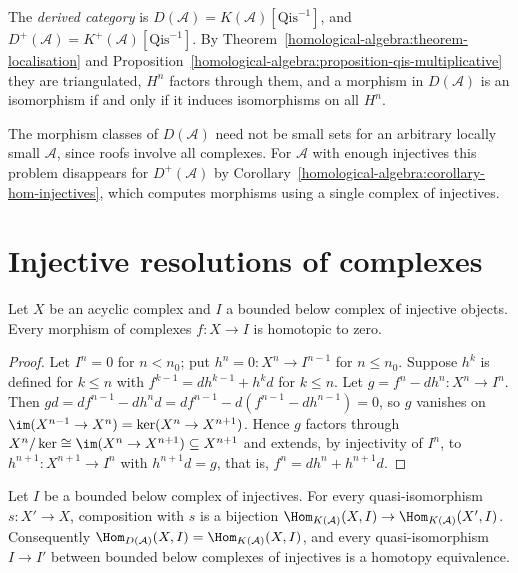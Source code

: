 \begin{definition}\label{homological-algebra:definition-derived-category}
The \emph{derived category} is $D(\mathcal{A}) = K(\mathcal{A})[\mathrm{Qis}^{-1}]$, and $D^+(\mathcal{A}) = K^+(\mathcal{A})[\mathrm{Qis}^{-1}]$. By
Theorem~\ref{homological-algebra:theorem-localisation} and Proposition~\ref{homological-algebra:proposition-qis-multiplicative} they are
triangulated, $H^n$ factors through them, and a morphism in $D(\mathcal{A})$ is an isomorphism if and only if it induces
isomorphisms on all $H^n$.
\end{definition}

\begin{remark}\label{homological-algebra:remark-size}
The morphism classes of $D(\mathcal{A})$ need not be small sets for an arbitrary locally small $\mathcal{A}$, since roofs involve all complexes.
For $\mathcal{A}$ with enough injectives this problem disappears for $D^+(\mathcal{A})$ by
Corollary~\ref{homological-algebra:corollary-hom-injectives}, which computes morphisms using a single complex of injectives.
\end{remark}

\section{Injective resolutions of complexes}\label{homological-algebra:section-injective-resolutions}

\begin{lemma}\label{homological-algebra:lemma-acyclic-to-injective}
Let $X$ be an acyclic complex and $I$ a bounded below complex of injective objects. Every morphism of complexes $f \colon X \to I$ is
homotopic to zero.
\end{lemma}

\begin{proof}
Let $I^n = 0$ for $n < n_0$; put $h^n = 0 \colon X^n \to I^{n-1}$ for $n \leq n_0$. Suppose $h^k$ is defined for $k \leq n$ with
$f^{k-1} = dh^{k-1} + h^kd$ for $k \leq n$. Let $g = f^n - dh^n \colon X^n \to I^n$. Then
$gd = df^{n-1} - dh^nd = df^{n-1} - d(f^{n-1} - dh^{n-1}) = 0$, so $g$ vanishes on $\im(X^{n-1} \to X^n) = \ker(X^n \to X^{n+1})$. Hence $g$
factors through $X^n/\ker \cong \im(X^n \to X^{n+1}) \subseteq X^{n+1}$ and extends, by injectivity of $I^n$, to $h^{n+1} \colon X^{n+1} \to I^n$ with
$h^{n+1}d = g$, that is, $f^n = dh^n + h^{n+1}d$.
\end{proof}

\begin{corollary}\label{homological-algebra:corollary-hom-injectives}
Let $I$ be a bounded below complex of injectives. For every quasi-isomorphism $s \colon X' \to X$, composition with $s$ is a bijection
$\Hom_{K(\mathcal{A})}(X, I) \to \Hom_{K(\mathcal{A})}(X', I)$. Consequently $\Hom_{D(\mathcal{A})}(X, I) = \Hom_{K(\mathcal{A})}(X, I)$, and every quasi-isomorphism
$I \to I'$ between bounded below complexes of injectives is a homotopy equivalence.
\end{corollary}

